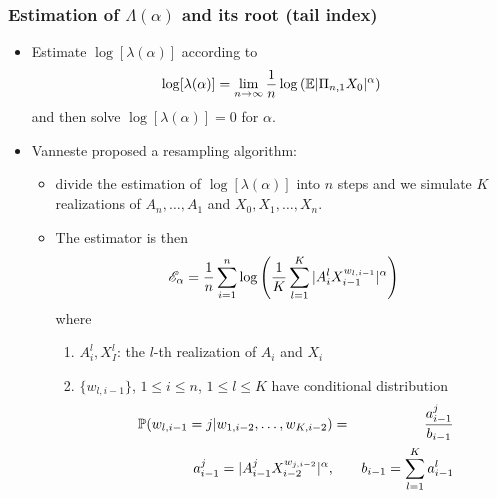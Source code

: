 \documentclass{beamer}
\begin{document}
\begin{frame}
  \begin{scriptsize}
    \frametitle{Estimation of $\Lambda(\alpha)$ and its root (tail index)}
    \begin{itemize}
    \item Estimate $\log[\lambda (\alpha)]$ according to
      \begin{equation}
        \log[\lambda(\alpha)] = \lim_{n \to \infty}{1 \over n} \log \left(
        \E |\Pi_{n, 1} X_0|^\alpha
        \right)
      \end{equation}
      and then solve $\log[\lambda(\alpha)] = 0$ for $\alpha$.
    \item Vanneste \cite{vanneste:2010} proposed a resampling algorithm:
      \begin{itemize}
      \item divide the estimation of $\log[\lambda(\alpha)]$ into $n$
        steps and we simulate $K$ realizations of $A_n, \dots, A_1$
        and $X_0, X_1, \dots, X_n$.
      \item The estimator is then
        \begin{equation}
          \mathscr E_\alpha =
                   {1 \over n}
                   \sum_{i=1}^n \log \left(
                       {1 \over K}\sum_{l=1}^K |A_i^l X^{w_{l, i-1}}_{i-1}|^\alpha
                       \right)
        \end{equation}
        where
        \begin{enumerate}
          \item $A_i^l, X_I^l$: the $l$-th realization of $A_i$ and
            $X_i$
          \item $\{w_{l, i-1}\}$, $1 \leq i \leq n$, $1 \leq l \leq K$
            have conditional distribution
            \begin{eqnarray*}
              \P(w_{l, i-1} = j | w_{1, i-2}, \dots, w_{K, i-2})
              &=& {a^j_{i-1} \over b_{i-1}} \\
              a_{i-1}^j = |A_{i-1}^j X_{i-2}^{w_{j, i-2}}|^\alpha,
              &\quad&
              b_{i-1} = \sum_{l=1}^K a_{i-1}^l
            \end{eqnarray*}
        \end{enumerate}
      \end{itemize}
    \end{itemize}
  \end{scriptsize}
\end{frame}
\end{document}

